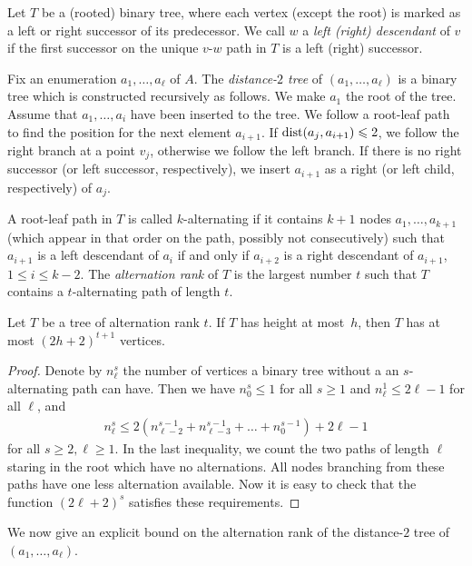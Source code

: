 Let $T$ be a (rooted) binary tree, where each vertex (except the root) is 
marked as a left or right successor of its predecessor. We call $w$ 
a \emph{left (right) descendant} of $v$ if the first successor on the unique
$v$-$w$ path in $T$ is a left (right) successor.

Fix an enumeration $a_1,\ldots, a_{\ell}$ of $A$. The \emph{distance-$2$ tree}
of $(a_1,\ldots,a_{\ell})$ is a binary tree which is constructed recursively as 
follows. We make $a_1$ the root of the tree. Assume that $a_1,\ldots, a_i$
have been inserted to the tree. We follow a root-leaf path to find the
position for the next element $a_{i+1}$. If $\mathrm{dist}(a_j,a_{i+1})\leqslant 2$, we
follow the right branch at a point $v_j$, otherwise we follow the left branch. If 
there is no right successor (or left successor, respectively), we insert $a_{i+1}$ 
as a right (or left child, respectively) of $a_j$. 

A root-leaf path in $T$ is called
$k$-alternating if it contains $k+1$ nodes $a_1,\ldots, a_{k+1}$ (which appear
in that order on the path, possibly not consecutively) such that $a_{i+1}$ is a left descendant of $a_i$
if and only if $a_{i+2}$ is a right descendant of $a_{i+1}$, $1\leq i\leq k-2$. 
The \emph{alternation rank} of $T$ is the largest number $t$ such that 
$T$ contains a $t$-alternating path of length $t$.

\begin{lemma}\label{lem:number-of-nodes}
Let $T$ be a tree of alternation rank $t$. If
$T$ has height at most~$h$, then $T$ has at most $(2h+2)^{t+1}$
vertices. 
\end{lemma}
\begin{proof}
Denote by $n_\ell^s$ the number of vertices a binary tree without a 
an $s$-alternating path can have. Then we have $n_0^s\leq 1$ for all $s\geq 1$
and $n_\ell^1\leq 2\ell-1$ for all $\ell$, and 
\begin{align*}
n_\ell^s\leq 2(n_{\ell-2}^{s-1}+n_{\ell-3}^{s-1}+\ldots + n_{0}^{s-1})+2\ell-1
\end{align*}
for all $s\geq 2,\ell\geq 1$. In the last inequality, we count the two paths of length
$\ell$ staring in the root which have no alternations. All nodes branching from 
these paths have one less alternation available. 
Now it is easy to check that the function $(2\ell+2)^s$ satisfies these requirements. 
\end{proof}


We now give an explicit bound on the alternation rank of the distance-$2$ 
tree of $(a_1,\ldots, a_\ell)$. 

